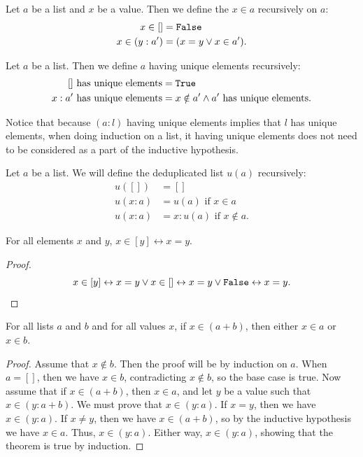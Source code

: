\documentclass[../../math.tex]{subfiles}
\begin{document}
\begin{definition}
    Let $a$ be a list and $x$ be a value.  Then we define the $x \in a$
    recursively on $a$:
    \begin{align*}
              x \in [] &= \vtt{False} \\
        x \in (y : a') &= (x = y \vee x \in a').
    \end{align*}
\end{definition}

\begin{definition}
    Let $a$ be a list.  Then we define $a$ having unique elements recursively:
    \begin{align*}
            \text{$[]$ has unique elements} &= \vtt{True} \\
        \text{$x : a'$ has unique elements} &= x \notin a' \wedge \text{$a'$ has
        unique elements.}
    \end{align*}
\end{definition}
\noindent Notice that because $(a : l)$ having unique elements implies that $l$
has unique elements, when doing induction on a list, it having unique elements
does not need to be considered as a part of the inductive hypothesis.

\begin{definition}
    Let $a$ be a list.  We will define the deduplicated list $u(a)$ recursively:
    \begin{align*}
        u([]) &= [] \\
        u(x : a) &= u(a) \text{ if $x \in a$} \\
        u(x : a) &= x : u(a) \text{ if $x \notin a$.}
    \end{align*}
\end{definition}

\begin{theorem}
    For all elements $x$ and $y$, $x \in [y] \leftrightarrow x = y$.
\end{theorem}
\begin{proof}
    \[
        x \in [y] \leftrightarrow x = y \vee x \in []
        \leftrightarrow x = y \vee \vtt{False}
        \leftrightarrow x = y.
    \]
\end{proof}

\begin{theorem} \label{in_list_conc}
    For all lists $a$ and $b$ and for all values $x$, if $x \in (a + b)$, then
    either $x \in a$ or $x \in b$.
\end{theorem}
\begin{proof}
    Assume that $x \notin b$.  Then the proof will be by induction on $a$.  When
    $a = []$, then we have $x \in b$, contradicting $x \notin b$, so the base
    case is true.  Now assume that if $x \in (a + b)$, then $x \in a$, and
    let $y$ be a value such that $x \in (y : a + b)$.  We must prove that $x \in
    (y : a)$.  If $x = y$, then we have $x \in (y : a)$.  If $x \neq y$, then we
    have $x \in (a + b)$, so by the inductive hypothesis we have $x \in a$.
    Thus, $x \in (y : a)$.  Either way, $x \in (y : a)$, showing that the
    theorem is true by induction.
\end{proof}
\end{document}
